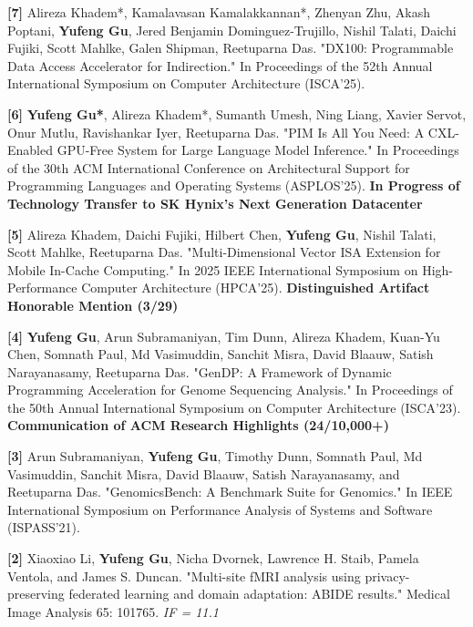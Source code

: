 \documentclass[10pt,a4paper,palatine]{moderncv}        %
\begin{document}
\begin{samepage}
\textbf{[7]} Alireza Khadem*, Kamalavasan Kamalakkannan*, Zhenyan Zhu, Akash Poptani, \textbf{Yufeng Gu}, Jered Benjamin Dominguez-Trujillo,  Nishil Talati, Daichi Fujiki, Scott Mahlke, Galen Shipman, Reetuparna Das. "DX100: Programmable Data Access Accelerator for Indirection." In Proceedings of the 52th Annual International Symposium on Computer Architecture (ISCA'25).
\par
\end{samepage}

\textbf{[6]} \textbf{Yufeng Gu*}, Alireza Khadem*, Sumanth Umesh, Ning Liang, Xavier Servot, Onur Mutlu, Ravishankar Iyer, Reetuparna Das. "PIM Is All You Need: A CXL-Enabled GPU-Free System for Large Language Model Inference." In Proceedings of the 30th ACM International Conference on Architectural Support for Programming Languages and Operating Systems (ASPLOS'25). 
{\color{red} \textbf{In Progress of Technology Transfer to SK Hynix's Next Generation Datacenter}}

\textbf{[5]} Alireza Khadem, Daichi Fujiki, Hilbert Chen, \textbf{Yufeng Gu}, Nishil Talati, Scott Mahlke, Reetuparna Das. "Multi-Dimensional Vector ISA Extension for Mobile In-Cache Computing." In 2025 IEEE International Symposium on High-Performance Computer Architecture (HPCA'25). {\color{red} \textbf{Distinguished Artifact Honorable Mention (3/29)}}

\textbf{[4]} \textbf{Yufeng Gu}, Arun Subramaniyan, Tim Dunn, Alireza Khadem, Kuan-Yu Chen, Somnath Paul, Md Vasimuddin, Sanchit Misra, David Blaauw, Satish Narayanasamy, Reetuparna Das. "GenDP: A Framework of Dynamic Programming Acceleration for Genome Sequencing Analysis." In Proceedings of the 50th Annual International Symposium on Computer Architecture (ISCA'23). {\color{red} \textbf{Communication of ACM Research Highlights (24/10,000+)}}

\textbf{[3]} Arun Subramaniyan, \textbf{Yufeng Gu}, Timothy Dunn, Somnath Paul, Md Vasimuddin, Sanchit Misra, David Blaauw, Satish Narayanasamy, and Reetuparna Das. "GenomicsBench: A Benchmark Suite for Genomics." In IEEE International Symposium on Performance Analysis of Systems and Software (ISPASS'21). 

\textbf{[2]} Xiaoxiao Li, \textbf{Yufeng Gu}, Nicha Dvornek, Lawrence H. Staib, Pamela Ventola, and James S. Duncan. "Multi-site fMRI analysis using privacy-preserving federated learning and domain adaptation: ABIDE results." Medical Image Analysis 65: 101765. \textit{IF = 11.1}
\end{document}
